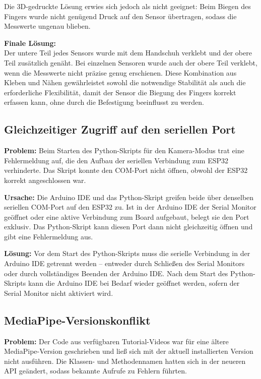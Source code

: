 \documentclass[12pt,a4paper]{article}
\begin{document}
Die 3D-gedruckte Lösung erwies sich jedoch als nicht geeignet: Beim Biegen 
des Fingers wurde nicht genügend Druck auf den Sensor übertragen, sodass 
die Messwerte ungenau blieben. 

\textbf{Finale Lösung:} \\
Der untere Teil jedes Sensors wurde mit dem Handschuh verklebt und der obere Teil zusätzlich genäht. Bei einzelnen Sensoren wurde auch der obere Teil verklebt, wenn die Messwerte nicht präzise genug erschienen. Diese Kombination aus Kleben und Nähen gewährleistet sowohl die notwendige Stabilität als auch die erforderliche Flexibilität, damit der Sensor die Biegung des Fingers korrekt erfassen kann, ohne durch die Befestigung beeinflusst zu werden.

\subsection{Gleichzeitiger Zugriff auf den seriellen Port}

\textbf{Problem:} Beim Starten des Python-Skripts für den Kamera-Modus trat eine Fehlermeldung auf, die den Aufbau der seriellen Verbindung zum ESP32 verhinderte. Das Skript konnte den COM-Port nicht öffnen, obwohl der ESP32 korrekt angeschlossen war.

\textbf{Ursache:} Die Arduino IDE und das Python-Skript greifen beide über denselben seriellen COM-Port auf den ESP32 zu. Ist in der Arduino IDE der Serial Monitor geöffnet oder eine aktive Verbindung zum Board aufgebaut, belegt sie den Port exklusiv. Das Python-Skript kann diesen Port dann nicht gleichzeitig öffnen und gibt eine Fehlermeldung aus.

\textbf{Lösung:} Vor dem Start des Python-Skripts muss die serielle Verbindung in der Arduino IDE getrennt werden -- entweder durch Schließen des Serial Monitors oder durch vollständiges Beenden der Arduino IDE. Nach dem Start des Python-Skripts kann die Arduino IDE bei Bedarf wieder geöffnet werden, sofern der Serial Monitor nicht aktiviert wird.

\subsection{MediaPipe-Versionskonflikt}

\textbf{Problem:} Der Code aus verfügbaren Tutorial-Videos war für eine ältere MediaPipe-Version geschrieben und ließ sich mit der aktuell installierten Version nicht ausführen. Die Klassen- und Methodennamen hatten sich in der neueren API geändert, sodass bekannte Aufrufe zu Fehlern führten.
\end{document}
